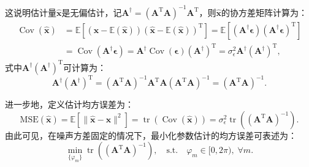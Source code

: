 这说明估计量$\hat{\bm x}$是无偏估计，记$\bm A^\dagger = (\bm{A}^{\mathrm{T}} \bm{A})^{-1} \bm{A}^{\mathrm{T}}$，则$\hat{\bm x}$的协方差矩阵计算为：
\begin{align}
	\operatorname{Cov}(\hat{\bm x})
	&= \mathbb{E}[(\hat{\bm x} - \mathbb{E}(\hat{\bm x}))(\hat{\bm x}- \mathbb{E}(\hat{\bm x}))^{\mathrm{T}}] 
	= \mathbb{E}\!\left[(\bm A^\dagger \bm\epsilon)(\bm A^\dagger \bm\epsilon)^{\mathrm T}\right] \\
	&= \operatorname{Cov}(\bm A^\dagger \bm\epsilon)
	=\bm A^\dagger \operatorname{Cov}(\bm\epsilon)(\bm A^\dagger)^{\mathrm T}
	= \sigma_\epsilon^2 \bm A^\dagger (\bm A^\dagger)^{\mathrm T},
\end{align}
式中$\bm A^\dagger (\bm A^\dagger)^{\mathrm T}$可计算为：
\begin{equation}
	\bm A^\dagger(\bm A^\dagger)^{\mathrm T}
	= (\bm A^{\mathrm T}\bm A)^{-1}\bm A^{\mathrm T}\bm A(\bm A^{\mathrm T}\bm A)^{-1}
	= (\bm A^{\mathrm T}\bm A)^{-1}.
\end{equation}

进一步地，定义估计均方误差为：
\begin{equation}
	\mathrm{MSE}(\hat{\bm x})
	= \mathbb{E}\!\left[\|\hat{\bm x}-\bm x\|^2\right]
	= \operatorname{tr}\!\left(\operatorname{Cov}(\hat{\bm x})\right)
	= \sigma_\epsilon^2 \operatorname{tr}\!\left((\bm A^{\mathrm T}\bm A)^{-1}\right).
\end{equation}
由此可见，在噪声方差固定的情况下，最小化参数估计的均方误差可表述为：
\begin{equation}
	\min_{\{\varphi_m\}} \operatorname{tr}\!\left((\bm A^{\mathrm T}\bm A)^{-1}\right), \quad \text{s.t.} \quad \varphi_m \in [0, 2\pi),\;\forall m. 
\end{equation}

